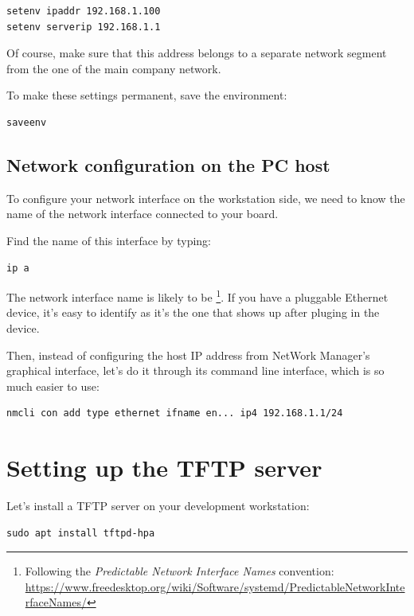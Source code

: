 \begin{verbatim}
setenv ipaddr 192.168.1.100
setenv serverip 192.168.1.1
\end{verbatim}

Of course, make sure that this address belongs to a separate network
segment from the one of the main company network.

To make these settings permanent, save the environment:

\begin{verbatim}
saveenv
\end{verbatim}

\subsection{Network configuration on the PC host}

To configure your network interface on the workstation side, we need
to know the name of the network interface connected to your board.

Find the name of this interface by typing:

\begin{verbatim}
ip a
\end{verbatim}

The network interface name is likely to be
\footnote{Following the {\em Predictable Network Interface
Names} convention:
\url{https://www.freedesktop.org/wiki/Software/systemd/PredictableNetworkInterfaceNames/}}.
If you have a pluggable Ethernet device, it's easy to identify as it's
the one that shows up after pluging in the device.

Then, instead of configuring the host IP address from NetWork Manager's
graphical interface, let's do it through its command line interface,
which is so much easier to use:

\begin{verbatim}
nmcli con add type ethernet ifname en... ip4 192.168.1.1/24
\end{verbatim}

\section{Setting up the TFTP server}

Let's install a TFTP server on your development workstation:

\begin{verbatim}
sudo apt install tftpd-hpa
\end{verbatim}

